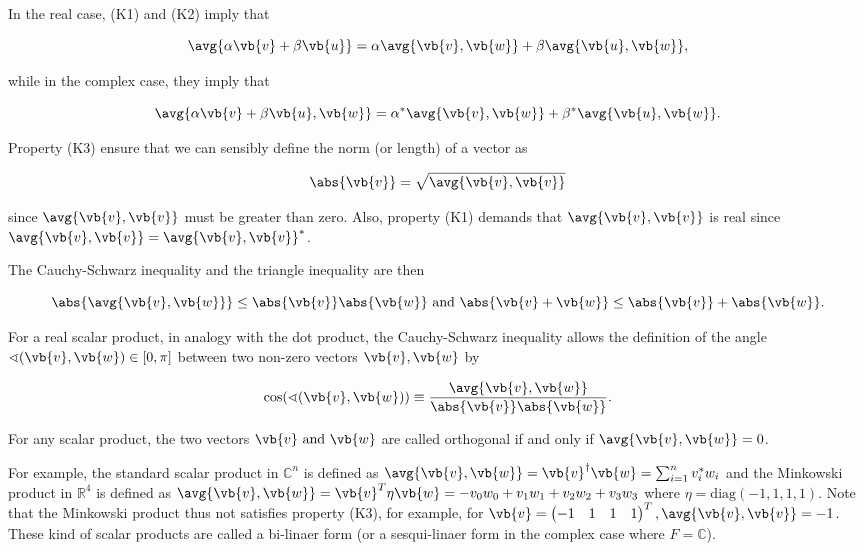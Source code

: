 \documentclass[a4paper,12pt]{report}
\begin{document}
In the real case, (K1) and (K2) imply that 

\begin{equation}
    \avg{\alpha \vb{v} + \beta \vb{u} } = \alpha \avg{\vb{v} ,\vb{w} } + \beta \avg{\vb{u} ,\vb{w} },   
\end{equation}

while in the complex case, they imply that 

\begin{equation}
    \avg{\alpha \vb{v} + \beta \vb{u} , \vb{w} } = \alpha ^*\avg{\vb{v} ,\vb{w} } + \beta ^* \avg{\vb{u} ,\vb{w} }.   
\end{equation}

Property (K3) ensure that we can sensibly define the norm (or length) of a vector as 

\begin{equation}
    \abs{\vb{v} } = \sqrt{\avg{\vb{v} ,\vb{v} } }  
\end{equation}

since \(\avg{\vb{v} ,\vb{v} } \) must be greater than zero. Also, property (K1) demands that \(\avg{\vb{v} ,\vb{v} } \) is real since \(\avg{\vb{v} ,\vb{v} } = \avg{\vb{v} ,\vb{v} }^*  \). 

The Cauchy-Schwarz inequality and the triangle inequality are then 

\begin{equation}
    \abs{\avg{\vb{v} ,\vb{w} } } \le \abs{\vb{v} }\abs{\vb{w} } \text { and } \abs{\vb{v} + \vb{w} } \le \abs{\vb{v} } + \abs{\vb{w} }.      
\end{equation}

For a real scalar product, in analogy with the dot product, the Cauchy-Schwarz inequality allows the definition of the angle \(\sphericalangle (\vb{v} ,\vb{w} ) \in  [0,\pi ]\) between two non-zero vectors \(\vb{v} ,\vb{w} \) by

\begin{equation}
    \cos (\sphericalangle (\vb{v} ,\vb{w} )) \equiv \frac{\avg{\vb{v} ,\vb{w} } }{\abs{\vb{v} }\abs{\vb{w} }  }. 
\end{equation}

For any scalar product, the two vectors \(\vb{v} \text { and } \vb{w} \) are called orthogonal if and only if \(\avg{\vb{v} ,\vb{w} } = 0\).  


For example, the standard scalar product in \(\mathbb{C}^{n} \) is defined as \(\avg{\vb{v} ,\vb{w} } = \vb{v} ^{\dagger} \vb{w} = \sum_{i=1}^{n} v_{i}^*w_{i}    \) and the Minkowski product in \(\mathbb{R}^{4} \) is defined as \(\avg{\vb{v} ,\vb{w} } = \vb{v} ^{T} \eta \vb{w} = -v_0 w_0 + v_1 w_1 +v_2 w_2 +v_3 w_3    \) where \(\eta = \text{diag}  (-1,1,1,1)\). Note that the Minkowski product thus not satisfies property (K3), for example, for \(\vb{v} = \begin{pmatrix}
    -1 & 1 & 1 &  1 \\
\end{pmatrix}^{T} , \avg{\vb{v} ,\vb{v} }  = -1\). These kind of scalar products are called a bi-linaer form (or a sesqui-linaer form in the complex case where \(F = \mathbb{C}\)).
\end{document}
